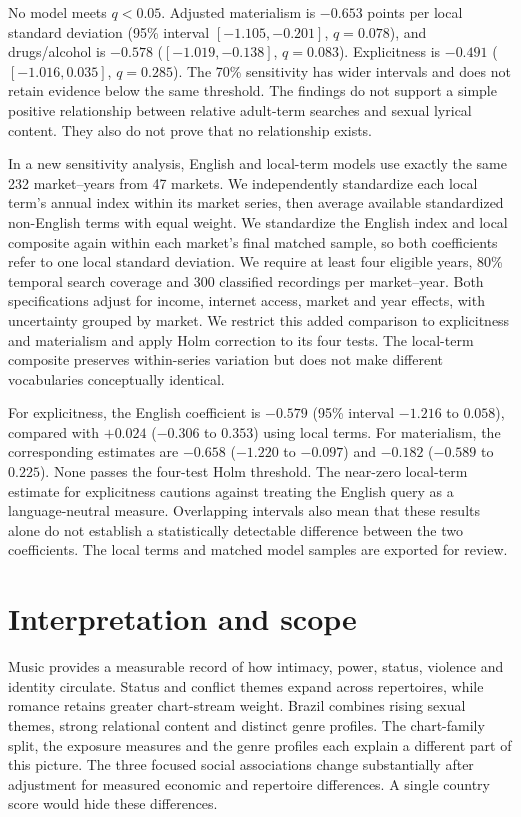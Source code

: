 \documentclass[10pt,a4paper,twocolumn]{article}
\begin{document}
No model meets $q<0.05$. Adjusted materialism is $-0.653$ points per local standard deviation (95\% interval $[-1.105,-0.201]$, $q=0.078$), and drugs/alcohol is $-0.578$ ($[-1.019,-0.138]$, $q=0.083$). Explicitness is $-0.491$ ($[-1.016,0.035]$, $q=0.285$). The 70\% sensitivity has wider intervals and does not retain evidence below the same threshold. The findings do not support a simple positive relationship between relative adult-term searches and sexual lyrical content. They also do not prove that no relationship exists.

In a new sensitivity analysis, English and local-term models use exactly the same 232 market--years from 47 markets. We independently standardize each local term's annual index within its market series, then average available standardized non-English terms with equal weight. We standardize the English index and local composite again within each market's final matched sample, so both coefficients refer to one local standard deviation. We require at least four eligible years, 80\% temporal search coverage and 300 classified recordings per market--year. Both specifications adjust for income, internet access, market and year effects, with uncertainty grouped by market. We restrict this added comparison to explicitness and materialism and apply Holm correction to its four tests. The local-term composite preserves within-series variation but does not make different vocabularies conceptually identical.

For explicitness, the English coefficient is $-0.579$ (95\% interval $-1.216$ to $0.058$), compared with $+0.024$ ($-0.306$ to $0.353$) using local terms. For materialism, the corresponding estimates are $-0.658$ ($-1.220$ to $-0.097$) and $-0.182$ ($-0.589$ to $0.225$). None passes the four-test Holm threshold. The near-zero local-term estimate for explicitness cautions against treating the English query as a language-neutral measure. Overlapping intervals also mean that these results alone do not establish a statistically detectable difference between the two coefficients. The local terms and matched model samples are exported for review.

\section{Interpretation and scope}
Music provides a measurable record of how intimacy, power, status, violence and identity circulate. Status and conflict themes expand across repertoires, while romance retains greater chart-stream weight. Brazil combines rising sexual themes, strong relational content and distinct genre profiles. The chart-family split, the exposure measures and the genre profiles each explain a different part of this picture. The three focused social associations change substantially after adjustment for measured economic and repertoire differences. A single country score would hide these differences.
\end{document}
